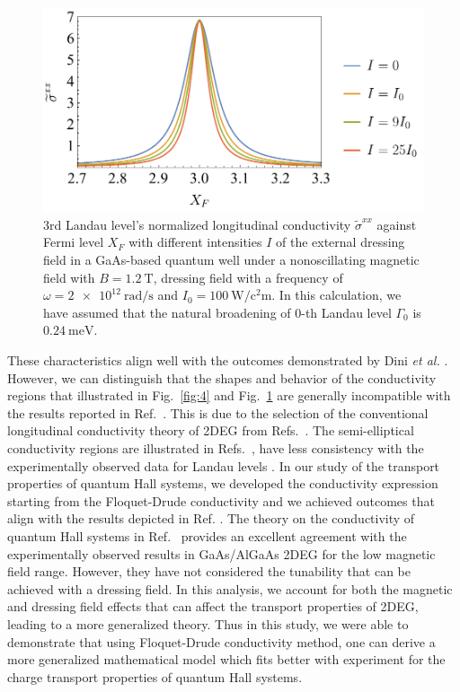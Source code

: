 \documentclass[
 reprint,
 amsmath,amssymb,
 aps,
 prb,
]{revtex4-2}
\begin{document}
\begin{figure}[t]
\includegraphics[scale=0.54]{fig_5_conductivity_with_fermi_level_zoomed}
\caption{$3$rd Landau level’s normalized longitudinal conductivity $\widetilde{\sigma}^{xx}$ against Fermi level $X_F$ with different intensities $I$ of the external dressing field in a GaAs-based quantum well under a nonoscillating magnetic field with $B = \SI{1.2}{\tesla}$, dressing field with a frequency of $\omega =\SI{2e12}{\radian\per\second}$ and $I_0 =\SI{100}{\watt\per\square\centi\metre}$.
In this calculation, we have assumed that the natural  broadening of $0$-th Landau level $\Gamma_0$ is $\SI{0.24}{\milli\eV}$.}
\label{fig:5}
\end{figure}

These characteristics align well with the outcomes demonstrated by Dini \textit{et al.} \cite{dini16}.
However, we can distinguish that the shapes and behavior of the conductivity regions that illustrated in Fig.~\ref{fig:4} and Fig.~\ref{fig:5} are generally incompatible with the results reported in Ref.~\cite{dini16}. This is due to the selection of the conventional longitudinal conductivity theory of 2DEG from Refs.~\cite{ando74_1,ando82}. The semi-elliptical conductivity regions are  illustrated in Refs.~\cite{dini16,ando74_1,ando82}, have less consistency with the experimentally observed data for Landau levels \cite{endo09}.
In our study of the transport properties of quantum Hall systems, we developed the conductivity expression starting from the Floquet-Drude conductivity \cite{wackerl20} and we achieved outcomes that align with the results depicted in Ref. \cite{endo09}.
The theory on the conductivity of quantum Hall systems in Ref.~\cite{endo09} provides an excellent agreement with the experimentally observed results in GaAs/AlGaAs 2DEG for the low magnetic field range.
However, they have not considered the tunability that can be achieved with a dressing field. In this analysis, we account for both the magnetic and dressing field effects that can affect the transport properties of 2DEG, leading to a more generalized theory. Thus in this study, we were able to demonstrate that using Floquet-Drude conductivity method, one can derive a more generalized mathematical model which fits better with experiment for the charge transport properties of quantum Hall systems.
\end{document}
